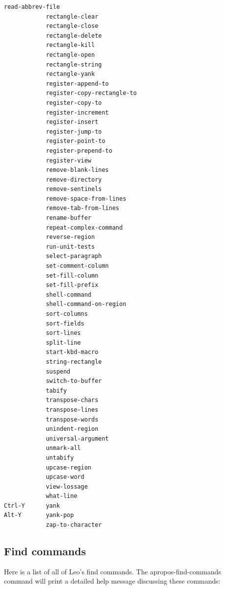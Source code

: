\documentclass[a4paper,10pt,english]{sphinxmanual}
\begin{document}
\begin{Verbatim}[commandchars=\\\{\}]
            read-abbrev-file
            rectangle-clear
            rectangle-close
            rectangle-delete
            rectangle-kill
            rectangle-open
            rectangle-string
            rectangle-yank
            register-append-to
            register-copy-rectangle-to
            register-copy-to
            register-increment
            register-insert
            register-jump-to
            register-point-to
            register-prepend-to
            register-view
            remove-blank-lines
            remove-directory
            remove-sentinels
            remove-space-from-lines
            remove-tab-from-lines
            rename-buffer
            repeat-complex-command
            reverse-region
            run-unit-tests
            select-paragraph
            set-comment-column
            set-fill-column
            set-fill-prefix
            shell-command
            shell-command-on-region
            sort-columns
            sort-fields
            sort-lines
            split-line
            start-kbd-macro
            string-rectangle
            suspend
            switch-to-buffer
            tabify
            transpose-chars
            transpose-lines
            transpose-words
            unindent-region
            universal-argument
            unmark-all
            untabify
            upcase-region
            upcase-word
            view-lossage
            what-line
Ctrl-Y      yank
Alt-Y       yank-pop
            zap-to-character
\end{Verbatim}


\subsection{Find commands}
\label{commands:find-commands}
Here is a list of all of Leo's find commands. The apropos-find-commands
command will print a detailed help message discussing these commands:
\end{document}
